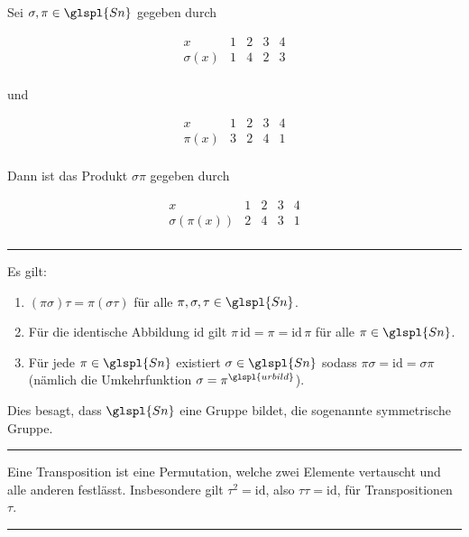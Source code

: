 \documentclass[9pt]{article}
\begin{document}
\begin{bsp}Sei \( \sigma, \pi \in \glspl{Sn} \) gegeben durch

\[
\begin{array}{c|cccc}
x & 1 & 2 & 3 & 4 \\
\hline
\sigma(x) & 1 & 4 & 2 & 3 \\
\end{array}
\]

und

\[
\begin{array}{c|cccc}
x & 1 & 2 & 3 & 4 \\
\hline
\pi(x) & 3 & 2 & 4 & 1 \\
\end{array}
\]

Dann ist das Produkt \( \sigma \pi \) gegeben durch

\[
\begin{array}{c|cccc}
x & 1 & 2 & 3 & 4 \\
\hline
\sigma(\pi(x)) & 2 & 4 & 3 & 1 \\
\end{array}
\]
\end{bsp} \noindent \rule{8cm}{0.4pt}
\begin{satz} Es gilt:
\begin{enumerate}
    \item \( (\pi \sigma) \tau = \pi (\sigma \tau) \) für alle \( \pi, \sigma, \tau \in \glspl{Sn} \). 
    \item Für die identische Abbildung \(\text{id}\) gilt \( \pi \, \text{id} = \pi = \text{id} \, \pi \) für alle \( \pi \in \glspl{Sn} \). 
    \item Für jede \( \pi \in \glspl{Sn} \) existiert \( \sigma \in \glspl{Sn} \) sodass \( \pi \sigma = \text{id} = \sigma \pi \) (nämlich die Umkehrfunktion \( \sigma = \pi^{\glspl{urbild}} \)).
\end{enumerate}
Dies besagt, dass \( \glspl{Sn} \) eine Gruppe bildet, die sogenannte symmetrische Gruppe. 

 \end{satz} \noindent \rule{8cm}{0.4pt}

\begin{defi}
Eine Transposition ist eine Permutation, welche zwei Elemente vertauscht und alle anderen festlässt. Insbesondere gilt \( \tau^2 = \text{id} \), also \( \tau \tau = \text{id} \), für Transpositionen \( \tau \). 
\end{defi} \noindent \rule{8cm}{0.4pt}
\end{document}

